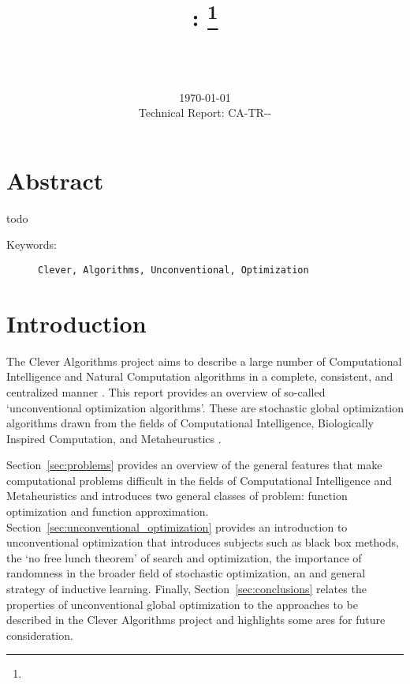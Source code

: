 \documentclass[a4paper, 11pt]{article}
\title{{\myreporttitle}: {\myreportsubtitle}\footnote{\myreportlicense}}
\author{\myreportauthor\\{\myreportemail}\\\small\myreportproject}
\date{\today\\{\small{Technical Report: CA-TR-{\myreportdate}-\myreportversion}}}
\begin{document}
\maketitle

\section*{Abstract} 
todo

\begin{description}
	\item[Keywords:] {\small\texttt{Clever, Algorithms, Unconventional, Optimization}}
\end{description} 

\section{Introduction}
\label{sec:introduction}
The Clever Algorithms project aims to describe a large number of Computational Intelligence and Natural Computation algorithms in a complete, consistent, and centralized manner \cite{Brownlee2010}.
This report provides an overview of so-called `unconventional optimization algorithms'. These are stochastic global optimization algorithms drawn from the fields of Computational Intelligence, Biologically Inspired Computation, and Metaheurustics \cite{Brownlee2010c}.

Section~\ref{sec:problems} provides an overview of the general features that make computational problems difficult in the fields of Computational Intelligence and Metaheuristics and introduces two general classes of problem: function optimization and function approximation.
Section~\ref{sec:unconventional_optimization} provides an introduction to unconventional optimization that introduces subjects such as black box methods, the `no free lunch theorem' of search and optimization, the importance of randomness in the broader field of stochastic optimization, an and general strategy of inductive learning. 
Finally, Section~\ref{sec:conclusions} relates the properties of unconventional global optimization to the approaches to be described in the Clever Algorithms project and highlights some ares for future consideration.

% 
% 
\end{document}
